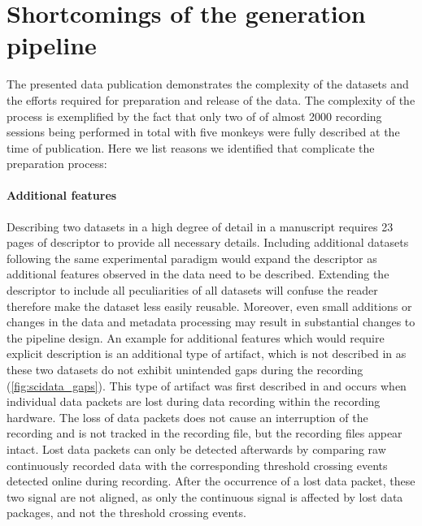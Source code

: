 \section{Shortcomings of the  generation pipeline}
\label{sec:scidata_shortcomings}
The presented data publication demonstrates the complexity of the datasets and the efforts required for preparation and release of the data. The complexity of the process is exemplified by the fact that only two of of almost 2000 recording sessions being performed in total with five monkeys were fully described at the time of publication. Here we list reasons we identified that complicate the preparation process:

\paragraph{Additional features}
\label{sec:additional_features_gaps}
Describing two datasets in a high degree of detail in a manuscript requires 23 pages of descriptor to provide all necessary details. Including additional datasets following the same experimental paradigm would expand the descriptor as additional features observed in the data need to be described. Extending the descriptor to include all peculiarities of all datasets will confuse the reader therefore make the dataset less easily reusable. Moreover, even small additions or changes in the data and metadata processing may result in substantial changes to the pipeline design.
An example for additional features which would require explicit description is an additional type of artifact, which is not described in \citet{Brochier_2018} as these two datasets do not exhibit unintended gaps during the recording (\cref{fig:scidata_gaps}). This type of artifact was first described in \citet{Sprenger_2014} and occurs when individual data packets are lost during data recording within the recording hardware. The loss of data packets does not cause an interruption of the recording and is not tracked in the recording file, but the recording files appear intact. Lost data packets can only be detected afterwards by comparing raw continuously recorded data with the corresponding threshold crossing events detected online during recording. After the occurrence of a lost data packet, these two signal are not aligned, as only the continuous signal is affected by lost data packages, and not the threshold crossing events.

